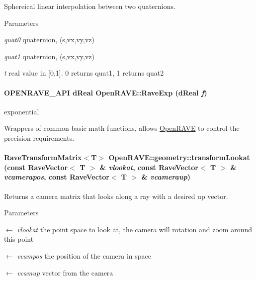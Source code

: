Sphereical linear interpolation between two quaternions. 


\begin{DoxyParams}{Parameters}
\item[{\em quat0}]quaternion, (s,vx,vy,vz) \item[{\em quat1}]quaternion, (s,vx,vy,vz) \item[{\em t}]real value in \mbox{[}0,1\mbox{]}. 0 returns quat1, 1 returns quat2 \end{DoxyParams}
\hypertarget{group__affine__math_gac8e9a4de3eada3445281cf83f63a71ad}{
\paragraph[{RaveExp}]{\setlength{\rightskip}{0pt plus 5cm}OPENRAVE\_\-API dReal OpenRAVE::RaveExp (dReal {\em f})}\hfill}
\label{group__affine__math_gac8e9a4de3eada3445281cf83f63a71ad}


exponential 

Wrappers of common basic math functions, allows \hyperlink{namespaceOpenRAVE}{OpenRAVE} to control the precision requirements. \hypertarget{group__affine__math_ga9db1071fa2f5264616dabb3b3d16eec9}{
\paragraph[{transformLookat}]{\setlength{\rightskip}{0pt plus 5cm}RaveTransformMatrix$<$T$>$ OpenRAVE::geometry::transformLookat (const RaveVector$<$ T $>$ \& {\em vlookat}, \/  const RaveVector$<$ T $>$ \& {\em vcamerapos}, \/  const RaveVector$<$ T $>$ \& {\em vcameraup})}\hfill}
\label{group__affine__math_ga9db1071fa2f5264616dabb3b3d16eec9}


Returns a camera matrix that looks along a ray with a desired up vector. 


\begin{DoxyParams}{Parameters}
\item[\mbox{$\leftarrow$} {\em vlookat}]the point space to look at, the camera will rotation and zoom around this point \item[\mbox{$\leftarrow$} {\em vcampos}]the position of the camera in space \item[\mbox{$\leftarrow$} {\em vcamup}]vector from the camera \end{DoxyParams}
